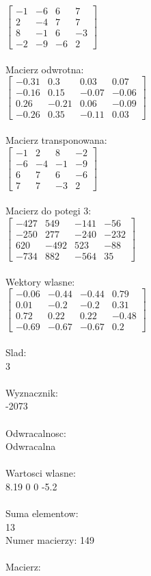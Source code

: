 \documentclass[a4paper,12pt]{article}
\begin{document}
$\begin{bmatrix} -1&-6&6&7\\2&-4&7&7\\8&-1&6&-3\\-2&-9&-6&2 \end{bmatrix}$
\\
\\
Macierz odwrotna:\\

$\begin{bmatrix} -0.31&0.3&0.03&0.07\\-0.16&0.15&-0.07&-0.06\\0.26&-0.21&0.06&-0.09\\-0.26&0.35&-0.11&0.03 \end{bmatrix}$
\\
\\
Macierz transponowana:\\

$\begin{bmatrix} -1&2&8&-2\\-6&-4&-1&-9\\6&7&6&-6\\7&7&-3&2 \end{bmatrix}$
\\
\\
Macierz do potegi 3:\\

$\begin{bmatrix} -427&549&-141&-56\\-250&277&-240&-232\\620&-492&523&-88\\-734&882&-564&35 \end{bmatrix}$
\\
\\
Wektory wlasne:\\

$\begin{bmatrix} -0.06&-0.44&-0.44&0.79\\0.01&-0.2&-0.2&0.31\\0.72&0.22&0.22&-0.48\\-0.69&-0.67&-0.67&0.2 \end{bmatrix}$
\\
\\
Slad:\\
3
\\
\\
Wyznacznik:\\
-2073
\\
\\
Odwracalnosc:\\
Odwracalna
\\
\\
Wartosci wlasne:\\
8.19 0 0 -5.2
\\
\\
Suma elementow:\\
13
\\
\newpage
Numer macierzy:
149
\\
\\
Macierz:\\
\end{document}
